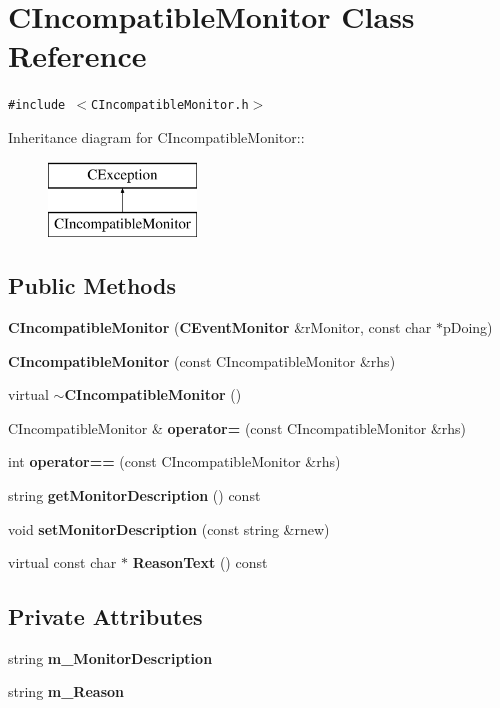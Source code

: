 \section{CIncompatible\-Monitor  Class Reference}
\label{classCIncompatibleMonitor}
{\tt \#include $<$CIncompatible\-Monitor.h$>$}

Inheritance diagram for CIncompatible\-Monitor::\begin{figure}[H]
\begin{center}
\leavevmode
\includegraphics[height=2cm]{classCIncompatibleMonitor}
\end{center}
\end{figure}
\subsection*{Public Methods}
\begin{CompactItemize}
\item 
{\bf CIncompatible\-Monitor} ({\bf CEvent\-Monitor} \&r\-Monitor, const char $\ast$p\-Doing)
\item 
{\bf CIncompatible\-Monitor} (const CIncompatible\-Monitor \&rhs)
\item 
virtual {\bf $\sim$CIncompatible\-Monitor} ()
\item 
CIncompatible\-Monitor \& {\bf operator=} (const CIncompatible\-Monitor \&rhs)
\item 
int {\bf operator==} (const CIncompatible\-Monitor \&rhs)
\item 
string {\bf get\-Monitor\-Description} () const
\item 
void {\bf set\-Monitor\-Description} (const string \&rnew)
\item 
virtual const char $\ast$ {\bf Reason\-Text} () const
\end{CompactItemize}
\subsection*{Private Attributes}
\begin{CompactItemize}
\item 
string {\bf m\_\-Monitor\-Description}
\item 
string {\bf m\_\-Reason}
\end{CompactItemize}


